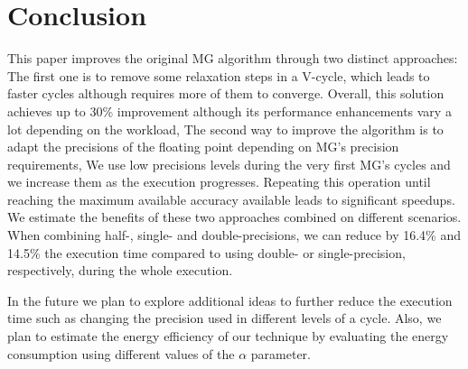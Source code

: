 \section{Conclusion}
\label{sec:conclusions}

This paper improves the original MG algorithm through two distinct approaches: The first
one is to remove some relaxation steps in a V-cycle, which leads to faster
cycles although requires more of them to converge.  Overall, this solution
achieves up to 30\% improvement although its performance enhancements vary a
lot depending on the workload, The second way to improve the algorithm is to
adapt the precisions of the floating point depending on MG's precision
requirements, We use low precisions levels during the very first MG's cycles
and we increase them as the execution progresses.  Repeating this operation
until reaching the maximum available accuracy available leads to significant
speedups.  We estimate the benefits of these two approaches combined on
different scenarios.  When combining half-, single- and double-precisions, we
can reduce by 16.4\% and 14.5\% the execution time compared to using double- or
single-precision, respectively, during the whole execution.

In the future we plan to explore additional ideas to further reduce the
execution time such as changing the precision used in different levels of a
cycle.  Also, we plan to estimate the energy efficiency of our technique by
evaluating the energy consumption using different values of the $\alpha$
parameter.




